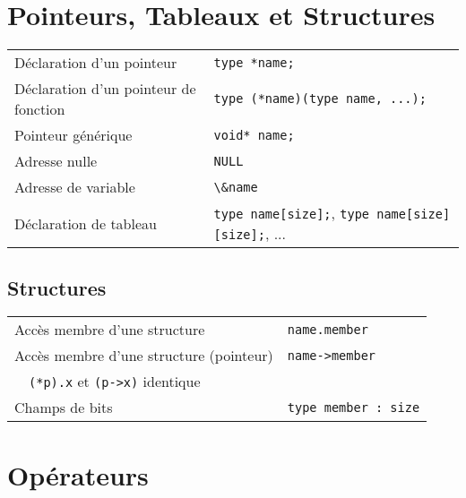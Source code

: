 \documentclass{article}
\newcommand{\cd}{\lstinline}
\begin{document}
\begin{multicols*}{3}
\section*{Pointeurs, Tableaux et Structures}
\begin{tabularx}{\linewidth}{Xl}
  Déclaration d'un pointeur & \cd{type *name;} \\
  Déclaration d'un pointeur de fonction & \cd{type (*name)(type name, ...);} \\
  Pointeur générique & \cd{void* name;} \\
  Adresse nulle & \cd{NULL} \\
  Adresse de variable & \cd{\&name} \\
  Déclaration de tableau & \cd{type name[size];}, \cd{type name[size][size];}, ... \\
\end{tabularx}

\subsection*{Structures}
\begin{tabularx}{\linewidth}{Xl}
  Accès membre d'une structure & \cd{name.member} \\
  Accès membre d'une structure (pointeur) & \cd{name->member} \\
  \ \ \cd{(*p).x} et \cd{(p->x)} identique & \\
  Champs de bits & \cd{type member : size} \\
\end{tabularx}

\section*{Opérateurs}


\end{multicols*}
\end{document}
